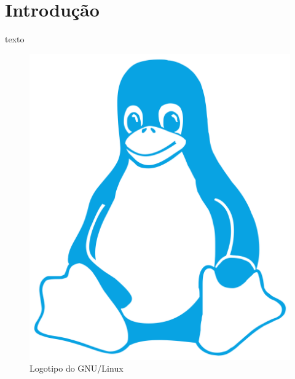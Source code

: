 \section{Introdução} \label{section: Introducao}
texto
\vspace{2cm}

\begin{figure}[H]
  \centering
  \includegraphics[scale=0.15]{Figures/0. General/linux_penguin.png}
  \caption{Logotipo do GNU/Linux}
  \label{fig: style 1 imagem de teste}
\end{figure}